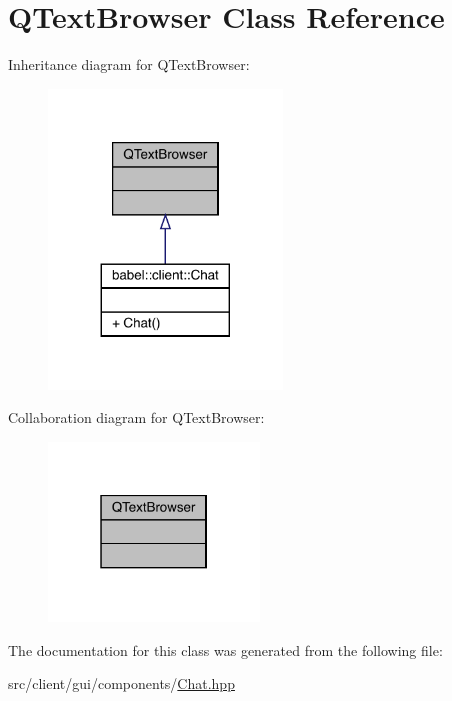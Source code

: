 \hypertarget{class_q_text_browser}{}\section{Q\+Text\+Browser Class Reference}
\label{class_q_text_browser}


Inheritance diagram for Q\+Text\+Browser\+:\nopagebreak
\begin{figure}[H]
\begin{center}
\leavevmode
\includegraphics[width=176pt]{class_q_text_browser__inherit__graph}
\end{center}
\end{figure}


Collaboration diagram for Q\+Text\+Browser\+:\nopagebreak
\begin{figure}[H]
\begin{center}
\leavevmode
\includegraphics[width=159pt]{class_q_text_browser__coll__graph}
\end{center}
\end{figure}


The documentation for this class was generated from the following file\+:\begin{DoxyCompactItemize}
\item 
src/client/gui/components/\mbox{\hyperlink{_chat_8hpp}{Chat.\+hpp}}\end{DoxyCompactItemize}
